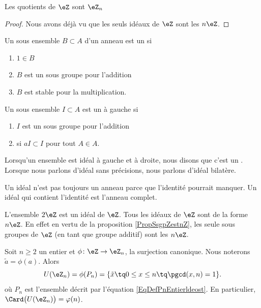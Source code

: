 \begin{corollary}
    Les quotients de \( \eZ\) sont \( \eZ_n\)
\end{corollary}

\begin{proof}
    Nous avons déjà vu que les seuls idéaux de \( \eZ\) sont les \( n\eZ\).
\end{proof}

\begin{definition}
    Un sous ensemble \( B\subset A\) d'un anneau est un  si
    \begin{enumerate}
        \item
            \( 1\in B\)
        \item
            \( B\) est un sous groupe pour l'addition
        \item
            \( B\) est stable pour la multiplication.
    \end{enumerate}
    Un sous ensemble \( I\subset A\) est un  à gauche si
    \begin{enumerate}
        \item
            \( I\) est un sous groupe pour l'addition
        \item
            si \( aI\subset I\) pour tout \( A\in A\).
    \end{enumerate}
\end{definition}
Lorsqu'un ensemble est idéal à gauche et à droite, nous disons que c'est un . Lorsque nous parlons d'idéal sans précisions, nous parlons d'idéal bilatère.

\begin{remark}
    Un idéal n'est pas toujours un anneau parce que l'identité pourrait manquer. Un idéal qui contient l'identité est l'anneau complet.
\end{remark}

\begin{example}
    L'ensemble \( 2\eZ\) est un idéal de \( \eZ\). Tous les idéaux de \( \eZ\) sont de la forme \( n\eZ\). En effet en vertu de la proposition \ref{PropSsgpZestnZ}, les seule sous groupes de \( \eZ\) (en tant que groupe additif) sont les \( n\eZ\).
\end{example}



\begin{proposition}     \label{PropZpintssiprempUzn}
    Soit \( n\geq 2\) un entier et \( \phi\colon \eZ\to \eZ_n\), la surjection canonique. Nous noterons \( \tilde a=\phi(a)\). Alors
    \begin{equation}
        U(\eZ_n)=\phi(P_n)=\{ \tilde x\tq 0\leq x\leq n\tq\pgcd(x,n)=1 \}.
    \end{equation}
    où \( P_n\) est l'ensemble décrit par l'équation \eqref{EqDefPnEntierldeost}. En particulier, \( \Card\big( U(\eZ_n) \big)=\varphi(n)\).

\end{proposition}

